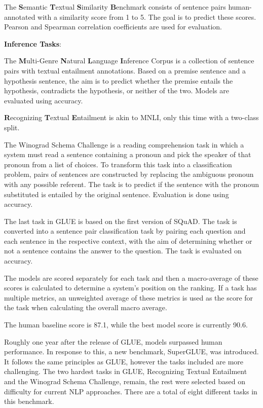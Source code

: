 \documentclass[]{krantz}
\begin{document}
The \textbf{S}emantic \textbf{T}extual \textbf{S}imilarity \textbf{B}enchmark consists of sentence pairs human-annotated with a similarity score from 1 to 5. The goal is to predict these scores. Pearson and Spearman correlation coefficients are used for evaluation.

\textbf{Inference Tasks}:

The \textbf{M}ulti-Genre \textbf{N}atural \textbf{L}anguage \textbf{I}nference Corpus is a collection of sentence pairs with textual entailment annotations. Based on a premise sentence and a hypothesis sentence, the aim is to predict whether the premise entails the hypothesis, contradicts the hypothesis, or neither of the two. Models are evaluated using accuracy.

\textbf{R}ecognizing \textbf{T}extual \textbf{E}ntailment is akin to MNLI, only this time with a two-class split.

The Winograd Schema Challenge is a reading comprehension task in which a system must read a sentence containing a pronoun and pick the speaker of that pronoun from a list of choices. To transform this task into a classification problem, pairs of sentences are constructed by replacing the ambiguous pronoun with any possible referent. The task is to predict if the sentence with the pronoun substituted is entailed by the original sentence. Evaluation is done using accuracy.

The last task in GLUE is based on the first version of SQuAD. The task is converted into a sentence pair classification task by pairing each question and each sentence in the respective context, with the aim of determining whether or not a sentence contains the answer to the question. The task is evaluated on accuracy.

The models are scored separately for each task and then a macro-average of these scores is calculated to determine a system's position on the ranking. If a task has multiple metrics, an unweighted average of these metrics is used as the score for the task when calculating the overall macro average. \citep{wang2018glue}

The human baseline score is 87.1, while the best model score is currently 90.6.

Roughly one year after the release of GLUE, models surpassed human performance. In response to this, a new benchmark, SuperGLUE, was introduced. It follows the same principles as GLUE, however the tasks included are more challenging. The two hardest tasks in GLUE, Recognizing Textual Entailment and the Winograd Schema Challenge, remain, the rest were selected based on difficulty for current NLP approaches. There are a total of eight different tasks in this benchmark.
\end{document}
